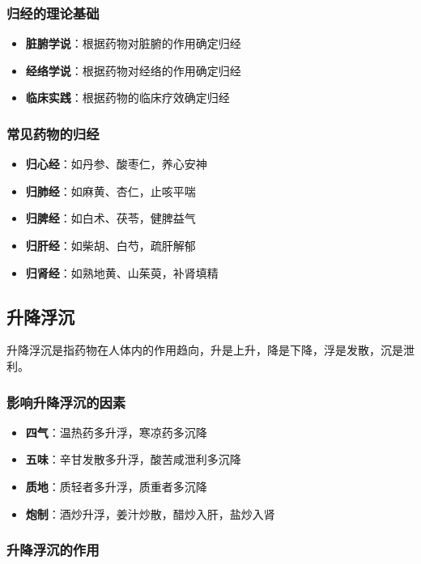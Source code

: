 \documentclass[12pt,UTF8]{ctexbook}
\begin{document}
\subsubsection{归经的理论基础}

\begin{itemize}
\item \textbf{脏腑学说}：根据药物对脏腑的作用确定归经
\item \textbf{经络学说}：根据药物对经络的作用确定归经
\item \textbf{临床实践}：根据药物的临床疗效确定归经
\end{itemize}

\subsubsection{常见药物的归经}

\begin{itemize}
\item \textbf{归心经}：如丹参、酸枣仁，养心安神
\item \textbf{归肺经}：如麻黄、杏仁，止咳平喘
\item \textbf{归脾经}：如白术、茯苓，健脾益气
\item \textbf{归肝经}：如柴胡、白芍，疏肝解郁
\item \textbf{归肾经}：如熟地黄、山茱萸，补肾填精
\end{itemize}

\subsection{升降浮沉}

升降浮沉是指药物在人体内的作用趋向，升是上升，降是下降，浮是发散，沉是泄利。

\subsubsection{影响升降浮沉的因素}

\begin{itemize}
\item \textbf{四气}：温热药多升浮，寒凉药多沉降
\item \textbf{五味}：辛甘发散多升浮，酸苦咸泄利多沉降
\item \textbf{质地}：质轻者多升浮，质重者多沉降
\item \textbf{炮制}：酒炒升浮，姜汁炒散，醋炒入肝，盐炒入肾
\end{itemize}

\subsubsection{升降浮沉的作用}
\end{document}
